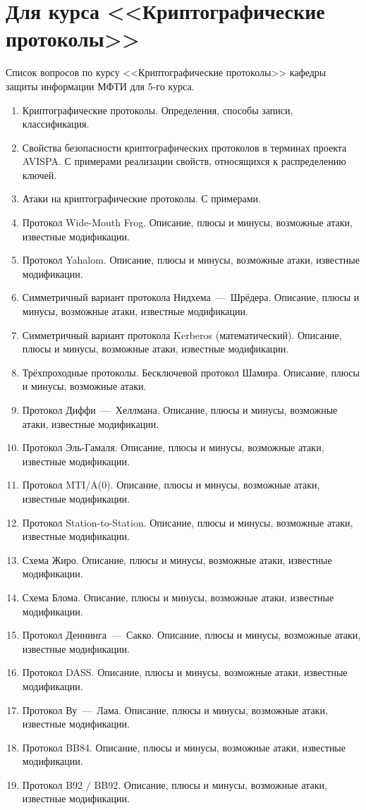 \section{Для курса <<Криптографические протоколы>>}

Список вопросов по курсу <<Криптографические протоколы>> кафедры защиты информации МФТИ для 5-го курса.

\begin{enumerate}
    \item Криптографические протоколы. Определения, способы записи, классификация.
    \item Свойства безопасности криптографических протоколов в терминах проекта AVISPA. С примерами реализации свойств, относящихся к распределению ключей.
    \item Атаки на криптографические протоколы. С примерами.

    \item Протокол Wide-Mouth Frog. Описание, плюсы и минусы, возможные атаки, известные модификации.
    \item Протокол Yahalom. Описание, плюсы и минусы, возможные атаки, известные модификации.
    \item Симметричный вариант протокола Нидхема~---~Шрёдера. Описание, плюсы и минусы, возможные атаки, известные модификации.
    \item Симметричный вариант протокола Kerberos (математический). Описание, плюсы и минусы, возможные атаки, известные модификации.
    \item Трёхпроходные протоколы. Бесключевой протокол Шамира. Описание, плюсы и минусы, возможные атаки.
    \item Протокол Диффи~---~Хеллмана. Описание, плюсы и минусы, возможные атаки, известные модификации.
    \item Протокол Эль-Гамаля. Описание, плюсы и минусы, возможные атаки, известные модификации.
    \item Протокол MTI/A(0). Описание, плюсы и минусы, возможные атаки, известные модификации.
    \item Протокол Station-to-Station. Описание, плюсы и минусы, возможные атаки, известные модификации.
    \item Схема Жиро. Описание, плюсы и минусы, возможные атаки, известные модификации.
    \item Схема Блома. Описание, плюсы и минусы, возможные атаки, известные модификации.
    \item Протокол Деннинга~---~Сакко. Описание, плюсы и минусы, возможные атаки, известные модификации.
    \item Протокол DASS. Описание, плюсы и минусы, возможные атаки, известные модификации.
    \item Протокол Ву~---~Лама. Описание, плюсы и минусы, возможные атаки, известные модификации.
    \item Протокол BB84. Описание, плюсы и минусы, возможные атаки, известные модификации.
    \item Протокол B92 / BB92. Описание, плюсы и минусы, возможные атаки, известные модификации.


\end{enumerate}
